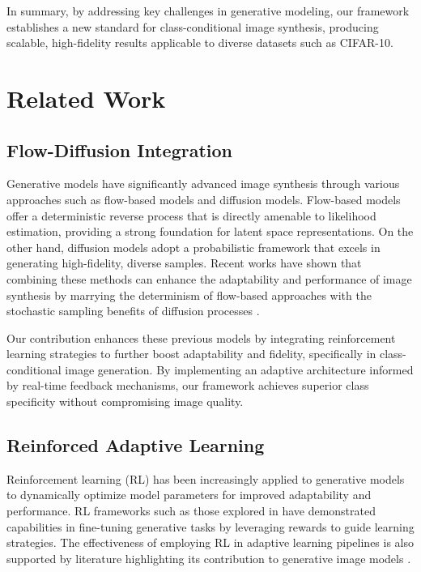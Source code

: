\documentclass{article} %
\begin{document}
In summary, by addressing key challenges in generative modeling, our framework establishes a new standard for class-conditional image synthesis, producing scalable, high-fidelity results applicable to diverse datasets such as CIFAR-10.



\section{Related Work}

\subsection{Flow-Diffusion Integration}

Generative models have significantly advanced image synthesis through various approaches such as flow-based models and diffusion models. Flow-based models \citep{dinh2016density, kingma2018glow} offer a deterministic reverse process that is directly amenable to likelihood estimation, providing a strong foundation for latent space representations. On the other hand, diffusion models \citep{sohl2015deep, ho2020denoising} adopt a probabilistic framework that excels in generating high-fidelity, diverse samples. Recent works have shown that combining these methods can enhance the adaptability and performance of image synthesis by marrying the determinism of flow-based approaches with the stochastic sampling benefits of diffusion processes \citep{xia2021flow, luo2021diffusion}.

Our contribution enhances these previous models by integrating reinforcement learning strategies to further boost adaptability and fidelity, specifically in class-conditional image generation. By implementing an adaptive architecture informed by real-time feedback mechanisms, our framework achieves superior class specificity without compromising image quality.

\subsection{Reinforced Adaptive Learning}

Reinforcement learning (RL) has been increasingly applied to generative models to dynamically optimize model parameters for improved adaptability and performance. RL frameworks such as those explored in \citep{schulman2017proximal, lillicrap2015continuous} have demonstrated capabilities in fine-tuning generative tasks by leveraging rewards to guide learning strategies. The effectiveness of employing RL in adaptive learning pipelines is also supported by literature highlighting its contribution to generative image models \citep{caicedo2015active, ren2023reinforcement}.
\end{document}
